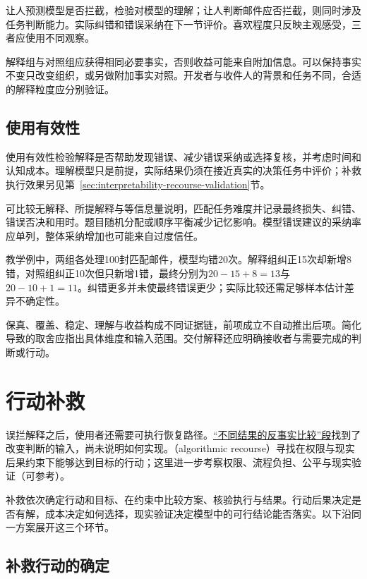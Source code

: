 让人预测模型是否拦截，检验对模型的理解；让人判断邮件应否拦截，则同时涉及任务判断能力。实际纠错和错误采纳在下一节评价。喜欢程度只反映主观感受，三者应使用不同观察。

解释组与对照组应获得相同必要事实，否则收益可能来自附加信息。可以保持事实不变只改变组织，或另做附加事实对照。开发者与收件人的背景和任务不同，合适的解释粒度应分别验证。

\subsection{使用有效性}
\label{sec:interpretability-quality-utility}

使用有效性检验解释是否帮助发现错误、减少错误采纳或选择复核，并考虑时间和认知成本。理解模型只是前提，实际结果仍须在接近真实的决策任务中评价；补救执行效果另见第~\ref{sec:interpretability-recourse-validation}节。

可比较无解释、所提解释与等信息量说明，匹配任务难度并记录最终损失、纠错、错误否决和用时。题目随机分配或顺序平衡减少记忆影响。模型错误建议的采纳率应单列，整体采纳增加也可能来自过度信任。

教学例中，两组各处理100封匹配邮件，模型均错20次。解释组纠正15次却新增8错，对照组纠正10次但只新增1错，最终分别为$20-15+8=13$与$20-10+1=11$。纠错更多并未使最终错误更少；实际比较还需足够样本估计差异不确定性。

保真、覆盖、稳定、理解与收益构成不同证据链，前项成立不自动推出后项。简化导致的取舍应指出具体维度和输入范围。交付解释还应明确接收者与需要完成的判断或行动。

\section{行动补救}
\label{sec:interpretability-recourse}

误拦解释之后，使用者还需要可执行恢复路径。\hyperref[sec:interpretability-local-counterfactual]{“不同结果的反事实比较”段}找到了改变判断的输入，尚未说明如何实现。（algorithmic recourse）寻找在权限与现实后果约束下能够达到目标的行动；这里进一步考察权限、流程负担、公平与现实验证（可参考）。

补救依次确定行动和目标、在约束中比较方案、核验执行与结果。行动后果决定是否有解，成本决定如何选择，现实验证决定模型中的可行结论能否落实。以下沿同一方案展开这三个环节。

\subsection{补救行动的确定}
\label{sec:interpretability-recourse-target}

